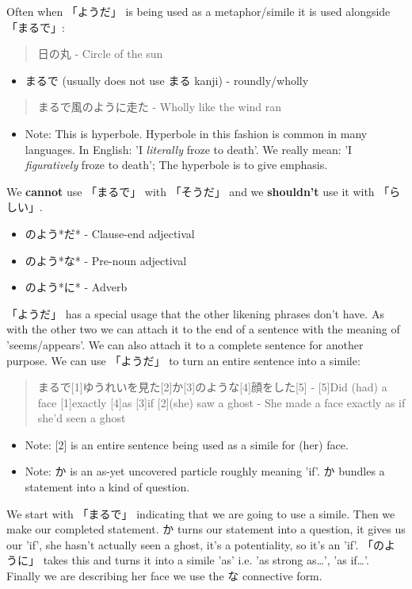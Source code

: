 \documentclass[11pt]{article}
\begin{document}
Often when 「ようだ」 is being used as a metaphor/simile it is used alongside 「まるで」:
\begin{quote}
日の丸 - Circle of the sun
\end{quote}
\begin{itemize}
\item まるで (usually does not use まる kanji) - roundly/wholly
\end{itemize}

\begin{quote}
まるで風のように走た - Wholly like the wind ran
\end{quote}
\begin{itemize}
\item Note: This is hyperbole. Hyperbole in this fashion is common in many languages. In English: 'I \emph{literally} froze to death'. We really mean: 'I \emph{figuratively} froze to death'; The hyperbole is to give emphasis.
\end{itemize}

We \textbf{cannot} use 「まるで」 with 「そうだ」 and we \textbf{shouldn't} use it with 「らしい」.

\begin{itemize}
\item のよう*だ* - Clause-end adjectival
\item のよう*な* - Pre-noun adjectival
\item のよう*に* - Adverb
\end{itemize}

「ようだ」 has a special usage that the other likening phrases don't have. As with the other two we can attach it to the end of a sentence with the meaning of 'seems/appears'. We can also attach it to a complete sentence for another purpose. We can use 「ようだ」 to turn an entire sentence into a simile:
\begin{quote}
まるで[1]ゆうれいを見た[2]か[3]のような[4]顔をした[5] - [5]Did (had) a face [1]exactly [4]as [3]if [2](she) saw a ghost - She made a face exactly as if she'd seen a ghost
\end{quote}
\begin{itemize}
\item Note: [2] is an entire sentence being used as a simile for (her) face.
\item Note: か is an as-yet uncovered particle roughly meaning 'if'. か bundles a statement into a kind of question.
\end{itemize}

We start with 「まるで」 indicating that we are going to use a simile. Then we make our completed statement. か turns our statement into a question, it gives us our 'if', she hasn't actually seen a ghost, it's a potentiality, so it's an 'if'. 「のように」 takes this and turns it into a simile 'as' i.e. 'as strong as\ldots{}', 'as if\ldots{}'. Finally we are describing her face we use the な connective form.
\end{document}
